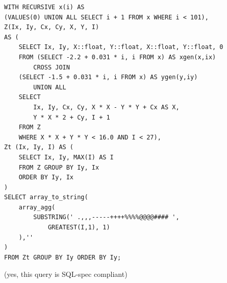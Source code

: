 \documentclass[svgnames]{beamer}
\begin{document}
\begin{frame}[fragile]
    \tiny
    \begin{verbatim}
WITH RECURSIVE x(i) AS
(VALUES(0) UNION ALL SELECT i + 1 FROM x WHERE i < 101),
Z(Ix, Iy, Cx, Cy, X, Y, I)
AS (
    SELECT Ix, Iy, X::float, Y::float, X::float, Y::float, 0
    FROM (SELECT -2.2 + 0.031 * i, i FROM x) AS xgen(x,ix)
        CROSS JOIN
    (SELECT -1.5 + 0.031 * i, i FROM x) AS ygen(y,iy)
        UNION ALL
    SELECT
        Ix, Iy, Cx, Cy, X * X - Y * Y + Cx AS X,
        Y * X * 2 + Cy, I + 1
    FROM Z
    WHERE X * X + Y * Y < 16.0 AND I < 27),
Zt (Ix, Iy, I) AS (
    SELECT Ix, Iy, MAX(I) AS I
    FROM Z GROUP BY Iy, Ix
    ORDER BY Iy, Ix
)
SELECT array_to_string(
    array_agg(
        SUBSTRING(' .,,,-----++++%%%%@@@@#### ',
            GREATEST(I,1), 1)
    ),''
)
FROM Zt GROUP BY Iy ORDER BY Iy;
    \end{verbatim}
    \normalsize
    (yes, this query is SQL-spec compliant)
\end{frame}

\begin{frame}
\end{frame}

\end{document}
